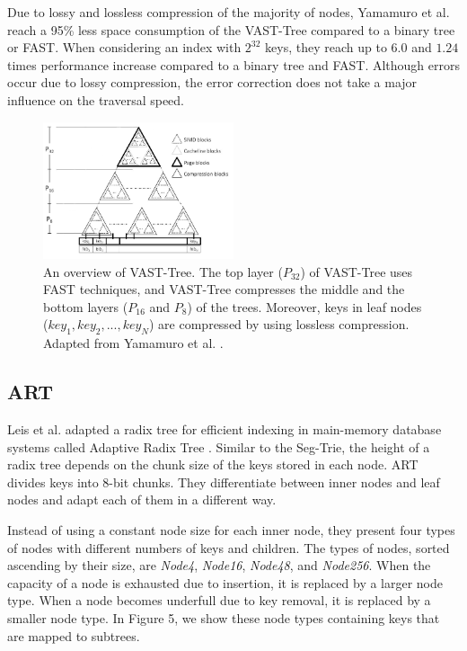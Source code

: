 \documentclass[runningheads,a4paper]{llncs}
\begin{document}
Due to lossy and lossless compression of the majority of nodes, Yamamuro et al. reach a 95\% less space consumption of the VAST-Tree compared to a binary tree or FAST. When considering an index with $2^{32}$ keys, they reach up to $6.0$ and $1.24$ times performance increase compared to a binary tree and FAST. Although errors occur due to lossy compression, the error correction does not take a major influence on the traversal speed.

\begin{figure}
	\includegraphics[width=0.5\textwidth]{figure_5.png}
	\caption{An overview of VAST-Tree. The top layer ($P_{32}$) of VAST-Tree uses FAST techniques, and VAST-Tree compresses the middle and the bottom layers ($P_{16}$ and $P_8$) of the trees. Moreover, keys in leaf nodes ($key_1, key_2, ...,	key_N$) are compressed by using lossless compression. Adapted from Yamamuro et al. \cite{yamamuro2012vast}.}
	\label{fig}
\end{figure}


\subsection{ART}\label{SCM}
Leis et al. adapted a radix tree for efficient indexing in main-memory database systems called Adaptive Radix Tree \cite{leis2013adaptive}. Similar to the Seg-Trie, the height of a radix tree depends on the chunk size of the keys stored in each node. ART divides keys into 8-bit chunks. They differentiate between inner nodes and leaf nodes and adapt each of them in a different way.

Instead of using a constant node size for each inner node, they present four types of nodes with different numbers of keys and children. The types of nodes, sorted ascending by their size, are \emph{Node4}, \emph{Node16}, \emph{Node48}, and \emph{Node256}. When the capacity of a node is exhausted due to insertion, it is replaced by a larger node type. When a node becomes underfull due to key removal, it is replaced by a smaller node type. In Figure 5, we show these node types containing keys that are mapped to subtrees.
\end{document}
